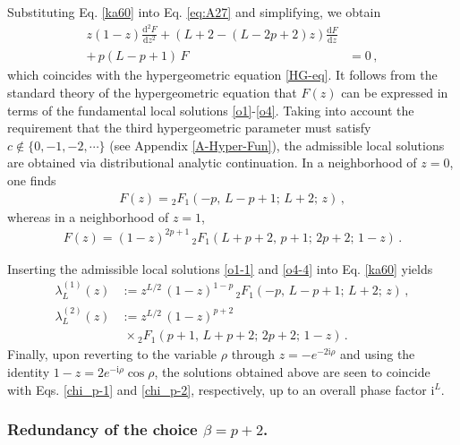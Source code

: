 \documentclass[aps,twocolumn,nofootinbib]{revtex4}
\begin{document}
{\begin{appendix}
Substituting Eq. \eqref{ka60} into Eq. \eqref{eq:A27} and simplifying, we obtain
\begin{align}\label{Gauss}
    z(1-z)\frac{\mathrm{d}_{}^2F}{\mathrm{d}z_{}^2} + 
    \left(L+2-(L-2p+2)z\right)\frac{\mathrm{d}F}{\mathrm{d}z} & \nonumber\\[3pt] 
    +\, p(L-p+1)\, F &= 0\,,
\end{align}
which coincides with the hypergeometric equation \eqref{HG-eq}. It follows from the standard theory of the hypergeometric equation that $F(z)$ can be expressed in terms of the fundamental local solutions \eqref{o1}-\eqref{o4}. Taking into account the requirement that the third hypergeometric parameter must satisfy $c\notin \{0,-1,-2,\cdots\}$ (see Appendix \ref{A-Hyper-Fun}), the admissible local solutions are obtained via distributional analytic continuation. In a neighborhood of $z=0$, one finds
\begin{align}\label{o1-1}
    F(z) = {}_2F_1(-p,\, L-p+1;\, L+2;\, z)\,,
\end{align}
whereas in a neighborhood of $z=1$,
\begin{align}\label{o4-4}
    F(z) = (1-z)^{2p+1}\, {}_2F_1(L+p+2,\, p+1;\, 2p+2;\,1-z)\,.
\end{align}

Inserting the admissible local solutions \eqref{o1-1} and \eqref{o4-4} into Eq. \eqref{ka60} yields
\begin{align}
    \lambda^{(1)}_L(z) &:= z_{}^{L/2} \,(1-z)_{}^{1-p}\,{}_2F_1^{}\!\left(-p,\,L-p+1;\,L+2;\,z\right)\,, \label{kha65}\\[3pt]
    \lambda^{(2)}_L(z) &:= z^{L/2}\, (1-z)^{p+2} \nonumber\\[3pt]
    & \;\times {}_2F_1^{}\left(p+1,\,L+p+2;\,2p+2;\,1-z\right)\,.\label{kha65-1}
\end{align}
Finally, upon reverting to the variable $\rho$ through $z=-e^{-2\mathrm{i}\rho}$ and using the identity $1-z=2e^{-\mathrm{i}\rho}\cos\rho$, the solutions obtained above are seen to coincide with Eqs. \eqref{chi_p-1} and \eqref{chi_p-2}, respectively, up to an overall phase factor $\mathrm{i}^{L}$.


\subsubsection{Redundancy of the choice $\beta=p+2$.}\label{Sec. AdamAshghal}


\end{appendix}}
\end{document}

